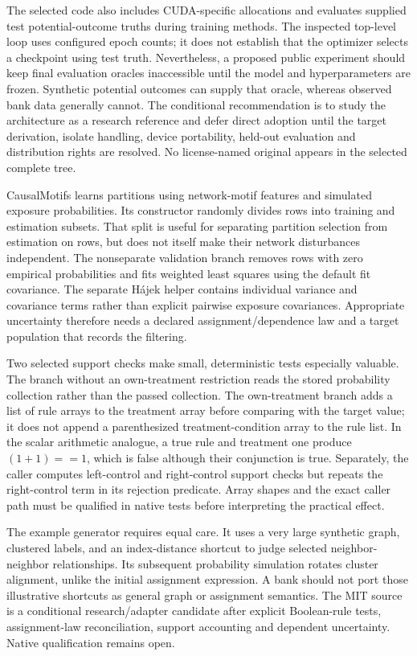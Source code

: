 The selected code also includes CUDA-specific allocations and evaluates supplied test potential-outcome truths during training methods. The inspected top-level loop uses configured epoch counts; it does not establish that the optimizer selects a checkpoint using test truth. Nevertheless, a proposed public experiment should keep final evaluation oracles inaccessible until the model and hyperparameters are frozen. Synthetic potential outcomes can supply that oracle, whereas observed bank data generally cannot. The conditional recommendation is to study the architecture as a research reference and defer direct adoption until the target derivation, isolate handling, device portability, held-out evaluation and distribution rights are resolved. No license-named original appears in the selected complete tree.~\citep{exec25_pnet_targeted,exec25_pnet_choice}

CausalMotifs learns partitions using network-motif features and simulated exposure probabilities. Its constructor randomly divides rows into training and estimation subsets. That split is useful for separating partition selection from estimation on rows, but does not itself make their network disturbances independent. The nonseparate validation branch removes rows with zero empirical probabilities and fits weighted least squares using the default fit covariance. The separate H\'ajek helper contains individual variance and covariance terms rather than explicit pairwise exposure covariances. Appropriate uncertainty therefore needs a declared assignment/dependence law and a target population that records the filtering.~\citep{exec25_pnet_motifs}

Two selected support checks make small, deterministic tests especially valuable. The branch without an own-treatment restriction reads the stored probability collection rather than the passed collection. The own-treatment branch adds a list of rule arrays to the treatment array before comparing with the target value; it does not append a parenthesized treatment-condition array to the rule list. In the scalar arithmetic analogue, a true rule and treatment one produce $(1+1)==1$, which is false although their conjunction is true. Separately, the caller computes left-control and right-control support checks but repeats the right-control term in its rejection predicate. Array shapes and the exact caller path must be qualified in native tests before interpreting the practical effect.~\citep{exec25_pnet_motifs,exec25_pnet_choice}

The example generator requires equal care. It uses a very large synthetic graph, clustered labels, and an index-distance shortcut to judge selected neighbor-neighbor relationships. Its subsequent probability simulation rotates cluster alignment, unlike the initial assignment expression. A bank should not port those illustrative shortcuts as general graph or assignment semantics. The MIT source is a conditional research/adapter candidate after explicit Boolean-rule tests, assignment-law reconciliation, support accounting and dependent uncertainty. Native qualification remains open.~\citep{exec25_pnet_motifs,exec25_pnet_choice}

